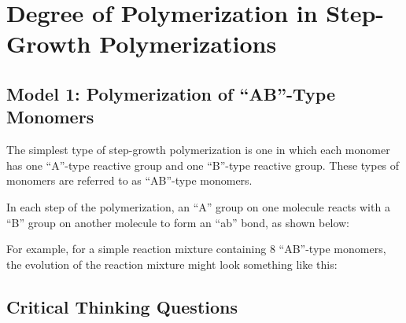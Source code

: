 %
%
%
%

\section{Degree of Polymerization in Step-Growth Polymerizations}
\renewcommand{\figpath}{content/polymchem/stepgrowth/Mn-and-stoich/figs}


\subsection{Model 1:  Polymerization of ``AB''-Type Monomers}

The simplest type of step-growth polymerization is one in which each monomer has one ``A''-type reactive group and one ``B''-type reactive group.
These types of monomers are referred to as ``AB''-type monomers.

In each step of the polymerization, an ``A'' group on one molecule reacts with a ``B'' group on another molecule to form an ``ab'' bond, as shown below:



For example, for a simple reaction mixture containing 8 ``AB''-type monomers, the evolution of the reaction mixture might look something like this:




\subsection{Critical Thinking Questions}

